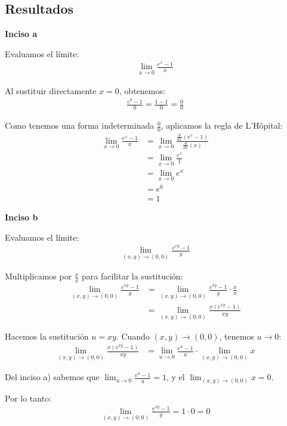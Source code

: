 \documentclass{article}
\begin{document}
\subsection{Resultados}
\setcounter{equation}{0}

\textbf{Inciso a}

Evaluamos el límite:
\begin{align}
\lim_{x \to 0} \frac{e^x - 1}{x}
\end{align}

Al sustituir directamente $x = 0$, obtenemos:
\begin{align}
\frac{e^0 - 1}{0} = \frac{1 - 1}{0} = \frac{0}{0}
\end{align}

Como tenemos una forma indeterminada $\frac{0}{0}$, aplicamos la regla de L'Hôpital:
\begin{align}
\lim_{x \to 0} \frac{e^x - 1}{x} &= \lim_{x \to 0} \frac{\frac{d}{dx}(e^x - 1)}{\frac{d}{dx}(x)} \\
&= \lim_{x \to 0} \frac{e^x}{1} \\
&= \lim_{x \to 0} e^x \\
&= e^0 \\
&= 1
\end{align}

\textbf{Inciso b}

Evaluamos el límite:
\begin{align}
\lim_{(x,y) \to (0,0)} \frac{e^{xy} - 1}{y}
\end{align}

Multiplicamos por $\frac{x}{x}$ para facilitar la sustitución:
\begin{align}
\lim_{(x,y) \to (0,0)} \frac{e^{xy} - 1}{y} &= \lim_{(x,y) \to (0,0)} \frac{e^{xy} - 1}{y} \cdot \frac{x}{x} \\
&= \lim_{(x,y) \to (0,0)} \frac{x(e^{xy} - 1)}{xy}
\end{align}

Hacemos la sustitución $u = xy$. Cuando $(x,y) \to (0,0)$, tenemos $u \to 0$:
\begin{align}
\lim_{(x,y) \to (0,0)} \frac{x(e^{xy} - 1)}{xy} &= \lim_{u \to 0} \frac{e^u - 1}{u} \cdot \lim_{(x,y) \to (0,0)} x
\end{align}

Del inciso a) sabemos que $\lim_{u \to 0} \frac{e^u - 1}{u} = 1$, y el $\lim_{(x,y) \to (0,0)} x = 0$.

Por lo tanto:
\begin{align}
\lim_{(x,y) \to (0,0)} \frac{e^{xy} - 1}{y} = 1 \cdot 0 = 0
\end{align}
\end{document}
